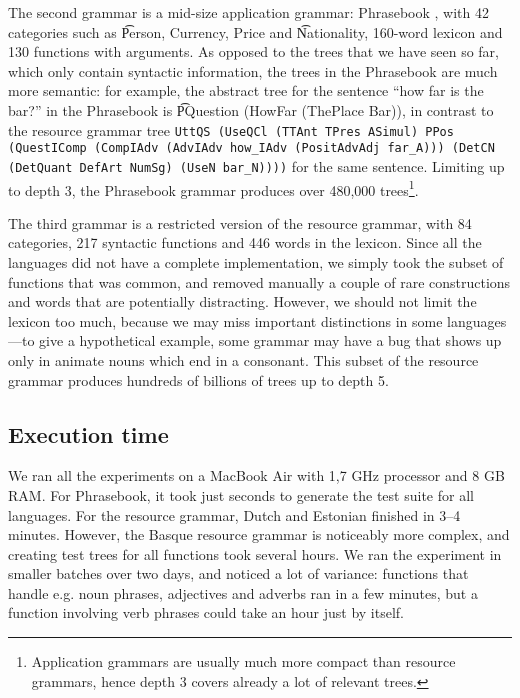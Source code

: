 The second grammar is a mid-size application grammar: Phrasebook
\cite{ranta2010phrasebook}, with 42 categories such as \t{Person,
  Currency, Price} and \t{Nationality}, 160-word lexicon and 130
functions with arguments. As opposed to the trees that we have seen so far,
which only contain syntactic information, the trees in the Phrasebook
are much more semantic: for example, the abstract tree for the
sentence ``how far is the bar?'' in the Phrasebook is \t{PQuestion
  (HowFar (ThePlace Bar))}, in contrast to the resource grammar tree
{\tt \small UttQS (UseQCl (TTAnt TPres ASimul) PPos (QuestIComp
  (CompIAdv (AdvIAdv how\_IAdv (PositAdvAdj far\_A))) 
  (DetCN (DetQuant DefArt NumSg) (UseN bar\_N))))} for the same
sentence. Limiting up to depth 3, the Phrasebook grammar produces over
480,000 trees\footnote{Application grammars are usually
much more compact than resource grammars, hence depth 3 covers already
a lot of relevant trees.}.



The third grammar is a restricted version of the \gf{} resource grammar,
with 84 categories, 217 syntactic functions and 446 words in the
lexicon. Since all the languages did not have a complete
implementation, we simply took the subset of functions that was
common, and removed manually a couple of rare constructions and words
that are potentially distracting. However, we should not limit the
lexicon too much, because we may miss important distinctions 
in some languages---to give a hypothetical example, some grammar may
have a bug that shows up only in animate nouns which end in a
consonant. This subset of the resource grammar produces hundreds of
billions of trees up to depth 5. 

\subsection{Execution time} We ran all the experiments on a MacBook Air
with 1,7 GHz processor and 8 GB RAM. For Phrasebook, it took just
seconds to generate the test suite for all languages. For the resource
grammar, Dutch and Estonian finished in 3--4 minutes. However, the
Basque resource grammar is noticeably more complex, and creating test
trees for all functions took several hours. We ran the experiment in
smaller batches over two days, and noticed a lot of variance:
functions that handle e.g. noun phrases, adjectives and adverbs ran in
a few minutes, but a function involving verb phrases could take an
hour just by itself.

